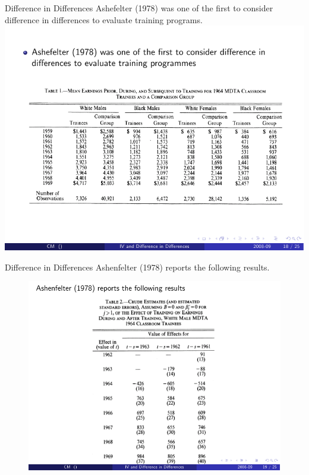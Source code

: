 \documentclass[xcolor=pdftex,dvipsnames,table,mathserif,aspectratio=169]{beamer}
\begin{document}
\begin{frame}{Difference in Differences}
Ashefelter (1978) was one of the first to consider difference in differences to evaluate training programs.
\includegraphics[scale=1]{./resources/ashefelter1.pdf}
\end{frame}

\begin{frame}{Difference in Differences}
Ashenfelter (1978) reports the following results.
\begin{figure}
\centering
\includegraphics[scale=.85]{./resources/ashefelter2.pdf}
\end{figure}
\end{frame}
\end{document}
